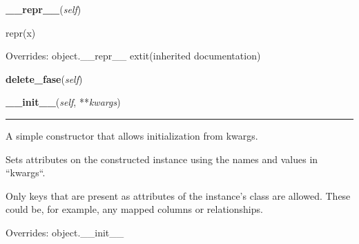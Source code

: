     \vspace{0.5ex}

\hspace{.8\funcindent}\begin{boxedminipage}{\funcwidth}

    \raggedright \textbf{\_\_repr\_\_}(\textit{self})

\setlength{\parskip}{2ex}
    repr(x)

\setlength{\parskip}{1ex}
      Overrides: object.\_\_repr\_\_ 	extit{(inherited documentation)}

    \end{boxedminipage}

    \label{app:modelo:fase:Fase:delete_fase}

    \vspace{0.5ex}

\hspace{.8\funcindent}\begin{boxedminipage}{\funcwidth}

    \raggedright \textbf{delete\_fase}(\textit{self})

\setlength{\parskip}{2ex}
\setlength{\parskip}{1ex}
    \end{boxedminipage}

    \vspace{0.5ex}

\hspace{.8\funcindent}\begin{boxedminipage}{\funcwidth}

    \raggedright \textbf{\_\_init\_\_}(\textit{self}, **\textit{kwargs})

    \vspace{-1.5ex}

    \rule{\textwidth}{0.5\fboxrule}
\setlength{\parskip}{2ex}
    A simple constructor that allows initialization from kwargs.

    Sets attributes on the constructed instance using the names and values 
    in ``kwargs``.

    Only keys that are present as attributes of the instance's class are 
    allowed. These could be, for example, any mapped columns or 
    relationships.

\setlength{\parskip}{1ex}
      Overrides: object.\_\_init\_\_

    \end{boxedminipage}


